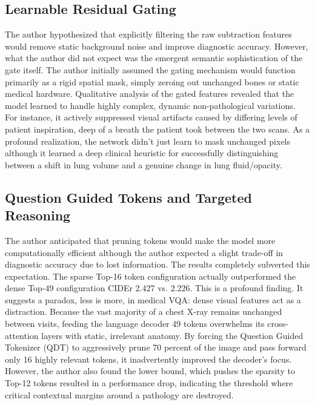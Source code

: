 \subsection{Learnable Residual Gating}
The author hypothesized that explicitly filtering the raw subtraction features would remove static background noise and improve diagnostic accuracy. However, what the author did not expect was the emergent semantic sophistication of the gate itself. The author initially assumed the gating mechanism would function primarily as a rigid spatial mask, simply zeroing out unchanged bones or static medical hardware. Qualitative analysis of the gated features revealed that the model learned to handle highly complex, dynamic non-pathological variations. For instance, it actively suppressed visual artifacts caused by differing levels of patient inspiration, deep of a breath the patient took between the two scans. As a profound realization, the network didn't just learn to mask unchanged pixels although it learned a deep clinical heuristic for successfully distinguishing between a shift in lung volume  and a genuine change in lung fluid/opacity.

\subsection{Question Guided Tokens and Targeted Reasoning}
The author anticipated that pruning tokens would make the model more computationally efficient although the author expected a slight trade-off in diagnostic accuracy due to lost information. The results completely subverted this expectation. The sparse Top-16 token configuration actually outperformed the dense Top-49 configuration CIDEr 2.427 vs. 2.226. This is a profound finding. It suggests a paradox, less is more, in medical VQA: dense visual features act as a distraction. Because the vast majority of a chest X-ray remains unchanged between visits, feeding the language decoder 49 tokens overwhelms its cross-attention layers with static, irrelevant anatomy. By forcing the Question Guided Tokenizer (QDT) to aggressively prune 70 percent of the image and pass forward only 16 highly relevant tokens, it inadvertently improved the decoder’s focus. However, the author also found the lower bound, which pushes the sparsity to Top-12 tokens resulted in a performance drop, indicating the threshold where critical contextual margins around a pathology are destroyed.

